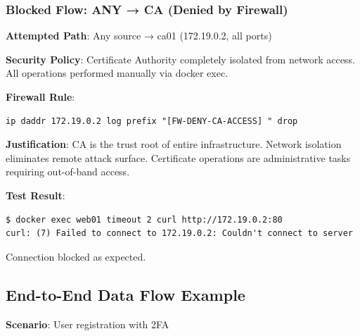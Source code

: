 \subsubsection{Blocked Flow: ANY → CA (Denied by Firewall)}

\textbf{Attempted Path}: Any source → ca01 (172.19.0.2, all ports)

\textbf{Security Policy}: Certificate Authority completely isolated from network access. All operations performed manually via docker exec.

\textbf{Firewall Rule}:
\begin{verbatim}
ip daddr 172.19.0.2 log prefix "[FW-DENY-CA-ACCESS] " drop
\end{verbatim}

\textbf{Justification}: CA is the trust root of entire infrastructure. Network isolation eliminates remote attack surface. Certificate operations are administrative tasks requiring out-of-band access.

\textbf{Test Result}:
\begin{verbatim}
$ docker exec web01 timeout 2 curl http://172.19.0.2:80
curl: (7) Failed to connect to 172.19.0.2: Couldn't connect to server
\end{verbatim}

Connection blocked as expected.

\subsection{End-to-End Data Flow Example}

\textbf{Scenario}: User registration with 2FA

